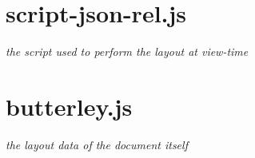 \section{script-json-rel.js}
\emph{the script used to perform the layout at view-time}
%

\newpage

\section{butterley.js}
\emph{the layout data of the document itself}
%
